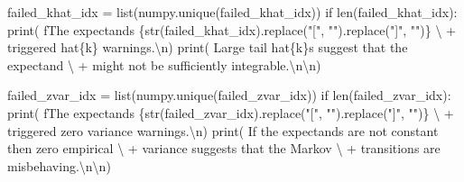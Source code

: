 \documentclass[
  letterpaper,
  DIV=11,
  numbers=noendperiod]{scrartcl}
\newenvironment{Shaded}{\begin{snugshade}}{\end{snugshade}}
\newcommand{\BuiltInTok}[1]{\textcolor[rgb]{0.00,0.23,0.31}{#1}}
\newcommand{\CharTok}[1]{\textcolor[rgb]{0.13,0.47,0.30}{#1}}
\newcommand{\ControlFlowTok}[1]{\textcolor[rgb]{0.00,0.23,0.31}{#1}}
\newcommand{\NormalTok}[1]{\textcolor[rgb]{0.00,0.23,0.31}{#1}}
\newcommand{\OperatorTok}[1]{\textcolor[rgb]{0.37,0.37,0.37}{#1}}
\newcommand{\SpecialCharTok}[1]{\textcolor[rgb]{0.37,0.37,0.37}{#1}}
\newcommand{\SpecialStringTok}[1]{\textcolor[rgb]{0.13,0.47,0.30}{#1}}
\newcommand{\StringTok}[1]{\textcolor[rgb]{0.13,0.47,0.30}{#1}}
\begin{document}
\begin{Shaded}
\begin{Highlighting}[]
\NormalTok{  failed\_khat\_idx }\OperatorTok{=} \BuiltInTok{list}\NormalTok{(numpy.unique(failed\_khat\_idx))}
  \ControlFlowTok{if} \BuiltInTok{len}\NormalTok{(failed\_khat\_idx):}
    \BuiltInTok{print}\NormalTok{( }\SpecialStringTok{f\textquotesingle{}The expectands }\SpecialCharTok{\{}\BuiltInTok{str}\NormalTok{(failed\_khat\_idx)}\SpecialCharTok{.}\NormalTok{replace(}\StringTok{"["}\NormalTok{, }\StringTok{""}\NormalTok{)}\SpecialCharTok{.}\NormalTok{replace(}\StringTok{"]"}\NormalTok{, }\StringTok{""}\NormalTok{)}\SpecialCharTok{\}}\SpecialStringTok{\textquotesingle{}}\NormalTok{ \textbackslash{}}
          \OperatorTok{+} \StringTok{\textquotesingle{} triggered hat}\SpecialCharTok{\{k\}}\StringTok{ warnings.}\CharTok{\textbackslash{}n}\StringTok{\textquotesingle{}}\NormalTok{)}
    \BuiltInTok{print}\NormalTok{(  }\StringTok{\textquotesingle{}  Large tail hat}\SpecialCharTok{\{k\}}\StringTok{s suggest that the expectand\textquotesingle{}}\NormalTok{ \textbackslash{}}
          \OperatorTok{+} \StringTok{\textquotesingle{} might not be sufficiently integrable.}\CharTok{\textbackslash{}n\textbackslash{}n}\StringTok{\textquotesingle{}}\NormalTok{)}
  
\NormalTok{  failed\_zvar\_idx }\OperatorTok{=} \BuiltInTok{list}\NormalTok{(numpy.unique(failed\_zvar\_idx))}
  \ControlFlowTok{if} \BuiltInTok{len}\NormalTok{(failed\_zvar\_idx):}
    \BuiltInTok{print}\NormalTok{(  }\SpecialStringTok{f\textquotesingle{}The expectands }\SpecialCharTok{\{}\BuiltInTok{str}\NormalTok{(failed\_zvar\_idx)}\SpecialCharTok{.}\NormalTok{replace(}\StringTok{"["}\NormalTok{, }\StringTok{""}\NormalTok{)}\SpecialCharTok{.}\NormalTok{replace(}\StringTok{"]"}\NormalTok{, }\StringTok{""}\NormalTok{)}\SpecialCharTok{\}}\SpecialStringTok{\textquotesingle{}}\NormalTok{ \textbackslash{}}
          \OperatorTok{+} \StringTok{\textquotesingle{} triggered zero variance warnings.}\CharTok{\textbackslash{}n}\StringTok{\textquotesingle{}}\NormalTok{)}
    \BuiltInTok{print}\NormalTok{(  }\StringTok{\textquotesingle{}  If the expectands are not constant then zero empirical\textquotesingle{}}\NormalTok{ \textbackslash{}}
          \OperatorTok{+} \StringTok{\textquotesingle{} variance suggests that the Markov\textquotesingle{}}\NormalTok{ \textbackslash{}}
          \OperatorTok{+} \StringTok{\textquotesingle{} transitions are misbehaving.}\CharTok{\textbackslash{}n\textbackslash{}n}\StringTok{\textquotesingle{}}\NormalTok{)}
  

\end{Highlighting}
\end{Shaded}
\end{document}
